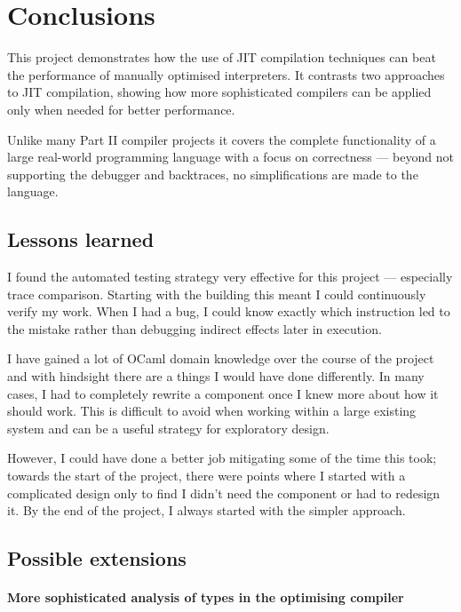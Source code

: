 \chapter{Conclusions}

This project demonstrates how the use of JIT compilation techniques can beat the performance
of manually optimised interpreters. It contrasts two approaches to JIT compilation, showing how
more sophisticated compilers can be applied only when needed for better performance.

Unlike many Part II compiler projects it covers the complete functionality of a large real-world
programming language with a focus on correctness --- beyond not supporting the debugger and
backtraces, no simplifications are made to the language.

\section{Lessons learned}

I found the automated testing strategy very effective for this project --- especially trace
comparison. Starting with the building this meant I could continuously verify my work. When I had a
bug, I could know exactly which instruction led to the mistake rather than debugging indirect
effects later in execution.

I have gained a lot of OCaml domain knowledge over the course of the project and with hindsight
there are a things I would have done differently. In many cases, I had to completely rewrite a
component once I knew more about how it should work. This is difficult to avoid when working within
a large existing system and can be a useful strategy for exploratory design.

However, I could have done a better job mitigating some of the time this took; towards the start of
the project, there were points where I started with a complicated design only to find I didn't need
the component or had to redesign it. By the end of the project, I always started with the simpler
approach.

\section{Possible extensions}

\subsubsection{More sophisticated analysis of types in the optimising compiler}


